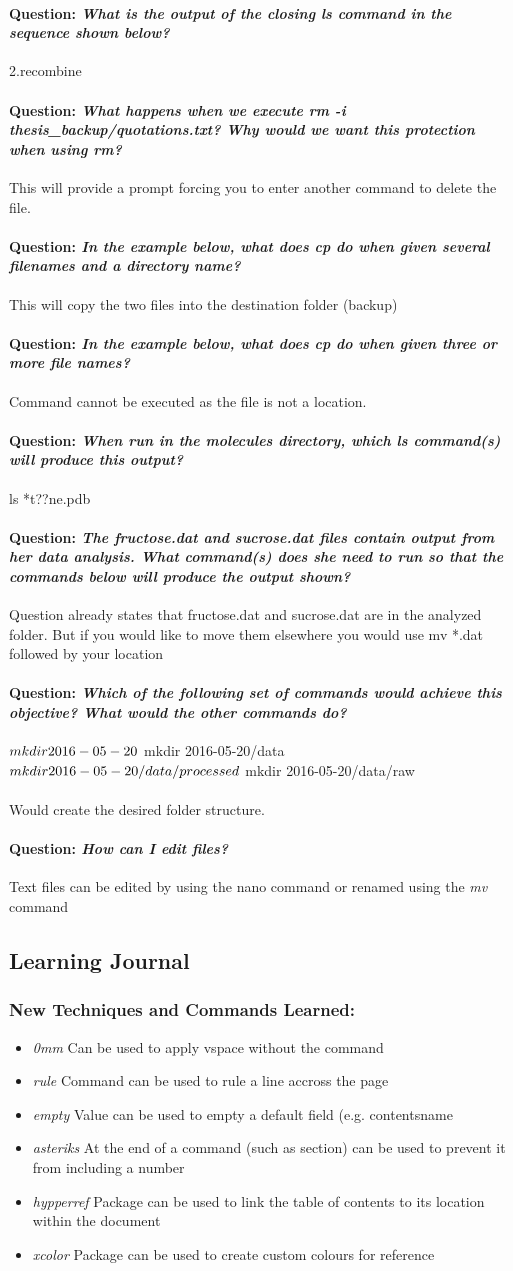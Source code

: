 \documentclass[12pt]{article}
\newcommand{\learning}[2]{\item \textit{#1} \textnormal{#2}}
\newcommand{\question}[1]{\paragraph{Question: {\textnormal{\textit{#1}}} ~\\}}
\begin{document}
\question{What is the output of the closing ls command in the sequence shown below?}
2.recombine

\question{What happens when we execute rm -i thesis\_backup/quotations.txt? Why would we want this protection when using rm?}
This will provide a prompt forcing you to enter another command to delete the file.

\question{In the example below, what does cp do when given several filenames and a directory name?}
This will copy the two files into the destination folder (backup)

\question{In the example below, what does cp do when given three or more file names?}
Command cannot be executed as the file is not a location.

\question{When run in the molecules directory, which ls command(s) will produce this output?}
ls *t??ne.pdb

\question{The fructose.dat and sucrose.dat files contain output from her data analysis. What command(s) does she need to run so that the commands below will produce the output shown?}
Question already states that fructose.dat and sucrose.dat are in the analyzed folder. But if you would like to move them elsewhere you would use mv *.dat followed by your location

\question{Which of the following set of commands would achieve this objective? What would the other commands do?}
$ mkdir 2016-05-20\\
$ mkdir 2016-05-20/data\\
$ mkdir 2016-05-20/data/processed\\
$ mkdir 2016-05-20/data/raw\\
\\
Would create the desired folder structure.

\question{How can I edit files?}
Text files can be edited by using the nano command or renamed using the \textit{mv} command

\subsection{Learning Journal}
\subsubsection{New Techniques and Commands Learned:}
\begin{itemize}
    \learning{0mm}{Can be used to apply vspace without the command}
    \learning{rule}{Command can be used to rule a line accross the page}
    \learning{empty}{Value can be used to empty a default field (e.g. contentsname}
    \learning{asteriks}{At the end of a command (such as section) can be used to prevent it from including a number}
    \learning{hypperref}{Package can be used to link the table of contents to its location within the document}
    \learning{xcolor}{Package can be used to create custom colours for reference}
\end{itemize}
\end{document}
